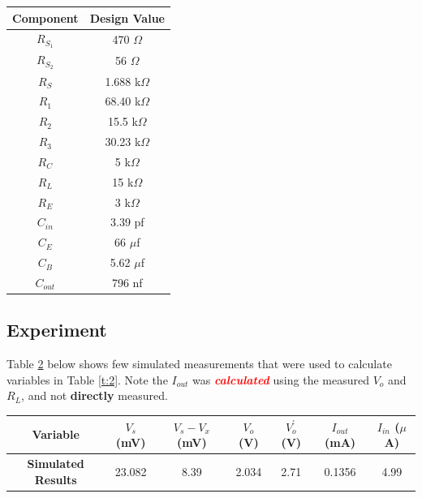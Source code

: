 \documentclass{article}
\begin{document}
	\begin{table}[!ht]
		\centering
		\begin{tabular}{|c|c|}
			\hline
			\textbf{Component} & \textbf{Design Value}\\
			\hline\hline
			$R_{S_1}$ & 470 $\Omega$\\
			\hline
			$R_{S_2}$ & 56 $\Omega$\\
			\hline
			$R_S$ & 1.688 k$\Omega$\\
			\hline\hline
			$R_1$ & 68.40 k$\Omega$\\
			\hline
			$R_2$ & 15.5 k$\Omega$\\
			\hline
			$R_3$ & 30.23 k$\Omega$\\
			\hline\hline
			$R_C$ & 5 k$\Omega$\\
			\hline
			$R_L$ & 15 k$\Omega$\\
			\hline
			$R_E$ & 3 k$\Omega$\\
			\hline\hline
			$C_{in}$ & 3.39 pf\\
			\hline
			$C_{E}$ & 66 $\mu$f\\
			\hline
			$C_{B}$ & 5.62 $\mu$f\\
			\hline		
			$C_{out}$ & 796 nf\\
			\hline
		\end{tabular}
		\label{t:1}
	\end{table}

	\pagebreak
	\subsection{Experiment}
	Table \ref{t:3} below shows few simulated measurements that were used to calculate variables in Table \ref{t:2}.
	Note the $I_{out}$ was \textcolor{red}{\textbf{\textit{calculated}}} using the measured $V_o$ and $R_L$, and not \textbf{directly} measured.
	\begin{table}[!ht]
		\centering
		\begin{tabular}{|c|c|c|c|c|c|c|}
			\hline
			\textbf{Variable} & $V_s$ (mV) & $V_s - V_x$ (mV) & $V_o$ (V) & $V_o^{'}$ (V) & $I_{out}$ (mA) & $I_{in}$ ($\mu$A)\\
			\hline
			\textbf{Simulated Results} & 23.082 & 8.39 & 2.034 & 2.71 & \color{red} 0.1356 & 4.99\\
			\hline
		\end{tabular}
		\label{t:3}
	\end{table}
	
\end{document}
